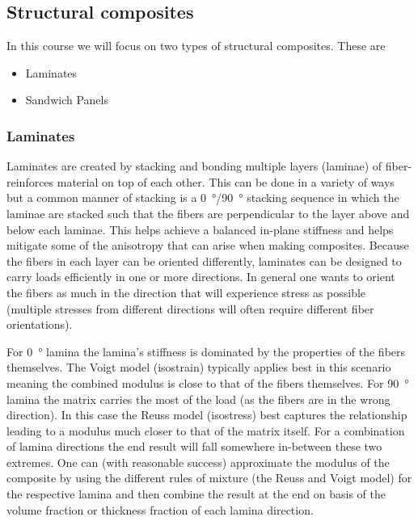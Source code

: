 
\subsection{Structural composites}
In this course we will focus on two types of structural composites. These are
\begin{itemize}
  \item Laminates
  \item Sandwich Panels
\end{itemize}

\subsubsection{Laminates}
Laminates are created by stacking and bonding multiple layers (laminae) of fiber-reinforces material on top of each other. This can be done in a variety of ways but a common manner of stacking is a \qty{0}{\degree}/\qty{90}{\degree} stacking sequence in which the laminae are stacked such that the fibers are perpendicular to the layer above and below each laminae. This helps achieve a balanced in-plane stiffness and helps mitigate some of the anisotropy that can arise when making composites. Because the fibers in each layer can be oriented differently, laminates can be designed to carry loads efficiently in one or more directions. In general one wants to orient the fibers as much in the direction that will experience stress as possible (multiple stresses from different directions will often require different fiber orientations).

For \qty{0}{\degree} lamina the lamina's stiffness is dominated by the properties of the fibers themselves. The Voigt model (isostrain) typically applies best in this scenario meaning the combined modulus is close to that of the fibers themselves. For \qty{90}{\degree} lamina the matrix carries the most of the load (as the fibers are in the wrong direction). In this case the Reuss model (isostress) best captures the relationship leading to a modulus much closer to that of the matrix itself. For a combination of lamina directions the end result will fall somewhere in-between these two extremes. One can (with reasonable success) approximate the modulus of the composite by using the different rules of mixture (the Reuss and Voigt model) for the respective lamina and then combine the result at the end on basis of the volume fraction or thickness fraction of each lamina direction. 

